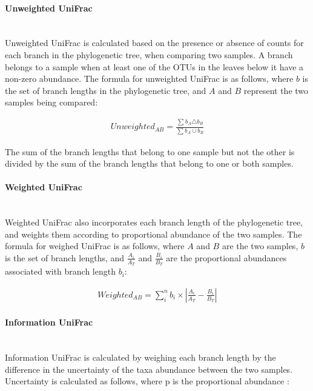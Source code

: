 \documentclass[10pt,letterpaper]{article}
\begin{document}
\paragraph{Unweighted UniFrac}\mbox{}\\
Unweighted UniFrac is calculated based on the presence or absence of counts for each branch in the phylogenetic tree, when comparing two samples. A branch belongs to a sample when at least one of the OTUs in the leaves below it have a non-zero abundance. The formula for unweighted UniFrac is as follows, where $b$ is the set of branch lengths in the phylogenetic tree, and $A$ and $B$ represent the two samples being compared:

\begin{align*}
Unweighted_{AB} = \frac{\sum_{}{} b_{A} \triangle b_{B}}{\sum_{}{} b_{A} \cup b_{B}}
\end{align*}

The sum of the branch lengths that belong to one sample but not the other is divided by the sum of the branch lengths that belong to one or both samples.

\paragraph{Weighted UniFrac}\mbox{}\\
Weighted UniFrac \cite{lozupone2007quantitative} also incorporates each branch length of the phylogenetic tree, and weights them according to proportional abundance of the two samples. The formula for weighed UniFrac is as follows, where $A$ and $B$ are the two samples, $b$ is the set of branch lengths, and $\frac{A_{i}}{A_{T}}$ and $\frac{B_{i}}{B_{T}}$ are the proportional abundances associated with branch length $b_{i}$:

\begin{align*}
Weighted_{AB} = \sum_{i}^{n} b_{i} \times \left| \frac{A_{i}}{A_{T}} - \frac{B_{i}}{B_{T}} \right|
\end{align*}

\paragraph{Information UniFrac}\mbox{}\\
Information UniFrac is calculated by weighing each branch length by the difference in the uncertainty of the taxa abundance between the two samples. Uncertainty is calculated as follows, where p is the proportional abundance \cite{shannon2001mathematical}:
\end{document}
